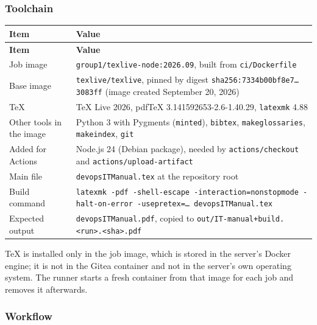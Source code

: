 \subsubsection{Toolchain}
\begin{tabularx}{\linewidth}{L{4.0cm}Y}
\caption{Build toolchain\label{Table:BuildToolchain}}\\
\toprule \textbf{Item} & \textbf{Value}\\ \midrule
\endfirsthead
\toprule \textbf{Item} & \textbf{Value}\\ \midrule
\endhead \bottomrule \endlastfoot
Job image & \texttt{group1/texlive-node:2026.09}, built from \texttt{ci/Dockerfile}\\
Base image & \texttt{texlive/texlive}, pinned by digest \texttt{sha256:7334b00bf8e7\ldots 3083ff} (image created September 20, 2026)\\
TeX & TeX Live 2026, pdfTeX 3.141592653-2.6-1.40.29, \texttt{latexmk} 4.88\\
Other tools in the image & Python 3 with Pygments (\texttt{minted}), \texttt{bibtex}, \texttt{makeglossaries}, \texttt{makeindex}, \texttt{git}\\
Added for Actions & Node.js 24 (Debian package), needed by \texttt{actions/checkout} and \texttt{actions/upload-artifact}\\
Main file & \texttt{devopsITManual.tex} at the repository root\\
Build command & \texttt{latexmk -pdf -shell-escape -interaction=nonstopmode -halt-on-error -usepretex=\ldots{} devopsITManual.tex}\\
Expected output & \texttt{devopsITManual.pdf}, copied to \texttt{out/IT-manual+build.<run>.<sha>.pdf}\\
\end{tabularx}
TeX is installed only in the job image, which is stored in the server's
Docker engine; it is not in the Gitea container and not in the server's own
operating system. The runner starts a fresh container from that image for
each job and removes it afterwards.

\subsubsection{Workflow}
\inputminted{yaml}{.gitea/workflows/build.yml}

